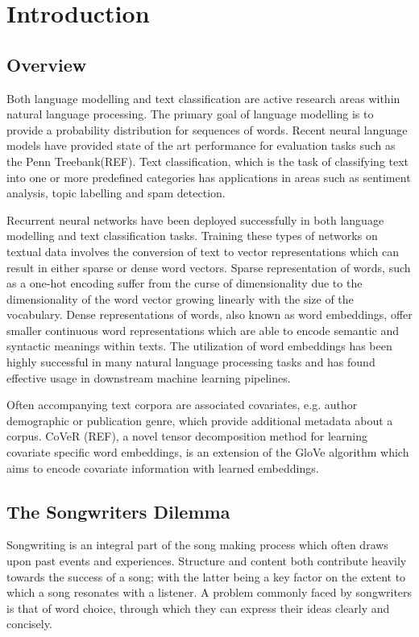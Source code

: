 \chapter{Introduction}
\label{chap:intro}
\section{Overview}
Both language modelling and text classification are active research areas within natural language processing. The primary goal of language modelling is to provide a probability distribution for sequences of words. Recent neural language models have provided state of the art performance for evaluation tasks such as the Penn Treebank(REF). Text classification, which is the task of classifying text into one or more predefined categories has applications in areas such as sentiment analysis, topic labelling and spam detection.   

\noindent
\newline
Recurrent neural networks have been deployed successfully in both language modelling and text classification tasks. Training these types of networks on textual data involves the conversion of text to vector representations which can  result in either sparse or dense word vectors. Sparse representation of words, such as a one-hot encoding suffer from the curse of dimensionality due to the dimensionality of the word vector growing linearly with the size of the vocabulary. Dense representations of words, also known as word embeddings, offer smaller continuous word representations which are able to encode semantic and syntactic meanings within texts. The utilization of word embeddings has been highly successful in many natural language processing tasks and has found effective usage in downstream machine learning pipelines.

\noindent
\newline
Often accompanying text corpora are associated covariates, e.g. author demographic or publication genre, which provide additional metadata about a corpus. CoVeR (REF), a novel tensor decomposition method for learning covariate specific word embeddings, is an extension of the GloVe algorithm which aims to encode covariate information with learned embeddings.

\section{The Songwriters Dilemma}
Songwriting is an integral part of the song making process which often draws upon past events and experiences. Structure and content both contribute heavily towards the success of a song; with the latter being a key factor on the extent to which a song resonates with a listener. A problem commonly faced by songwriters is that of word choice, through which they can express their ideas clearly and concisely.

